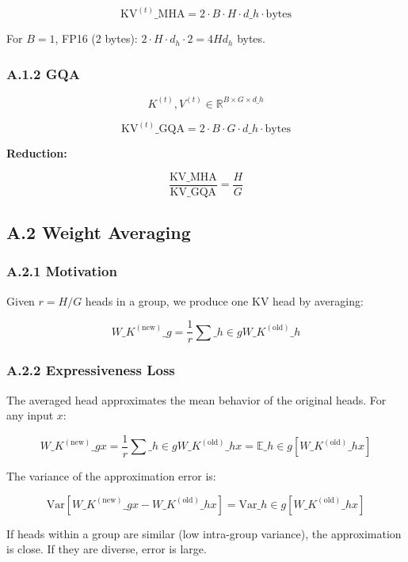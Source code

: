 \[
\text{KV}^{(t)}\_\text{MHA} = 2 \cdot B \cdot H \cdot d\_h \cdot \text{bytes}
\tag{A.2}
\]

For $B = 1$, FP16 ($2$ bytes): $2 \cdot H \cdot d_h \cdot 2 = 4 H d_h$ bytes.

\subsubsection{A.1.2 GQA}

\[
K^{(t)}, V^{(t)} \in \mathbb{R}^{B \times G \times d\_h}
\tag{A.3}
\]

\[
\text{KV}^{(t)}\_\text{GQA} = 2 \cdot B \cdot G \cdot d\_h \cdot \text{bytes}
\tag{A.4}
\]

\textbf{Reduction:}

\[
\frac{\text{KV}\_\text{MHA}}{\text{KV}\_\text{GQA}} = \frac{H}{G}
\tag{A.5}
\]

\subsection{A.2 Weight Averaging}

\subsubsection{A.2.1 Motivation}

Given $r = H / G$ heads in a group, we produce one KV head by averaging:

\[
W\_K^{(\text{new})}\_g = \frac{1}{r} \sum\_{h \in g} W\_K^{(\text{old})}\_h
\tag{A.6}
\]

\subsubsection{A.2.2 Expressiveness Loss}

The averaged head approximates the mean behavior of the original heads. 
For any input $x$:

\[
W\_K^{(\text{new})}\_g x = \frac{1}{r} \sum\_{h \in g} W\_K^{(\text{old})}\_h x = \mathbb{E}\_{h \in g}[W\_K^{(\text{old})}\_h x]
\tag{A.7}
\]

The variance of the approximation error is:

\[
\text{Var}[W\_K^{(\text{new})}\_g x - W\_K^{(\text{old})}\_h x] = \text{Var}\_{h \in g}[W\_K^{(\text{old})}\_h x]
\tag{A.8}
\]

If heads within a group are similar (low intra-group variance), the 
approximation is close. If they are diverse, error is large.

